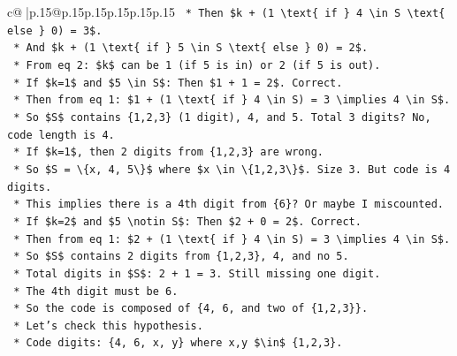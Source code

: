 \documentclass{article}
\begin{document}
{\begin{supertabular}{c@{$\;$}|p{.15\linewidth}@{}p{.15\linewidth}p{.15\linewidth}p{.15\linewidth}p{.15\linewidth}p{.15\linewidth}}
{{{\texttt{                *   Then \$k + (1 \textbackslash{}text\{ if \} 4 \textbackslash{}in S \textbackslash{}text\{ else \} 0) = 3\$.} \\
\texttt{                *   And \$k + (1 \textbackslash{}text\{ if \} 5 \textbackslash{}in S \textbackslash{}text\{ else \} 0) = 2\$.} \\
\texttt{                *   From eq 2: \$k\$ can be 1 (if 5 is in) or 2 (if 5 is out).} \\
\texttt{                *   If \$k=1\$ and \$5 \textbackslash{}in S\$: Then \$1 + 1 = 2\$. Correct.} \\
\texttt{                    *   Then from eq 1: \$1 + (1 \textbackslash{}text\{ if \} 4 \textbackslash{}in S) = 3 \textbackslash{}implies 4 \textbackslash{}in S\$.} \\
\texttt{                    *   So \$S\$ contains \{1,2,3\} (1 digit), 4, and 5. Total 3 digits? No, code length is 4.} \\
\texttt{                    *   If \$k=1\$, then 2 digits from \{1,2,3\} are wrong.} \\
\texttt{                    *   So \$S = \textbackslash{}\{x, 4, 5\textbackslash{}\}\$ where \$x \textbackslash{}in \textbackslash{}\{1,2,3\textbackslash{}\}\$. Size 3. But code is 4 digits.} \\
\texttt{                    *   This implies there is a 4th digit from \{6\}? Or maybe I miscounted.} \\
\texttt{                *   If \$k=2\$ and \$5 \textbackslash{}notin S\$: Then \$2 + 0 = 2\$. Correct.} \\
\texttt{                    *   Then from eq 1: \$2 + (1 \textbackslash{}text\{ if \} 4 \textbackslash{}in S) = 3 \textbackslash{}implies 4 \textbackslash{}in S\$.} \\
\texttt{                    *   So \$S\$ contains 2 digits from \{1,2,3\}, 4, and no 5.} \\
\texttt{                    *   Total digits in \$S\$: 2 + 1 = 3. Still missing one digit.} \\
\texttt{                    *   The 4th digit must be 6.} \\
\texttt{                    *   So the code is composed of \{4, 6, and two of \{1,2,3\}\}.} \\
\texttt{                    *   Let's check this hypothesis.} \\
\texttt{                    *   Code digits: \{4, 6, x, y\} where x,y \$\textbackslash{}in\$ \{1,2,3\}.} \\
}}}
\end{supertabular}}
\end{document}
